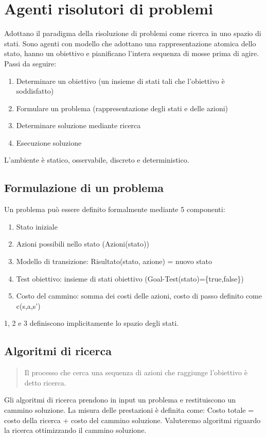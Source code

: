 \documentclass{article}
\begin{document}
\section{Agenti risolutori di problemi}
Adottano il paradigma della risoluzione di problemi come ricerca in uno spazio di stati. Sono agenti con modello che adottano una rappresentazione atomica dello stato, hanno un obiettivo e pianificano l'intera sequenza di mosse prima di agire. \newline
Passi da seguire:
\begin{enumerate}
    \item Determinare un obiettivo (un insieme di stati tali che l'obiettivo è soddisfatto)
    \item Formulare un problema (rappresentazione degli stati e delle azioni)
    \item Determinare soluzione mediante ricerca
    \item Esecuzione soluzione
\end{enumerate}
L'ambiente è statico, osservabile, discreto e deterministico.

\subsection{Formulazione di un problema}
Un problema può essere definito formalmente mediante 5 componenti:
\begin{enumerate}
    \item Stato iniziale
    \item Azioni possibili nello stato (Azioni(stato))
    \item Modello di transizione: Risultato(stato, azione) = nuovo stato
    \item Test obiettivo: insieme di stati obiettivo (Goal-Test(stato)=\{true,false\})
    \item Costo del cammino: somma dei costi delle azioni, costo di passo definito come c(s,a,s')
\end{enumerate}
1, 2 e 3 definiscono implicitamente lo spazio degli stati.

\subsection{Algoritmi di ricerca}
\begin{quote}
    Il processo che cerca una sequenza di azioni che raggiunge l'obiettivo è detto ricerca.
\end{quote}
Gli algoritmi di ricerca prendono in input un problema e restituiscono un cammino soluzione. La misura delle prestazioni è definita come: Costo totale = costo della ricerca + costo del cammino soluzione. Valuteremo algoritmi riguardo la ricerca ottimizzando il cammino soluzione.
\end{document}
